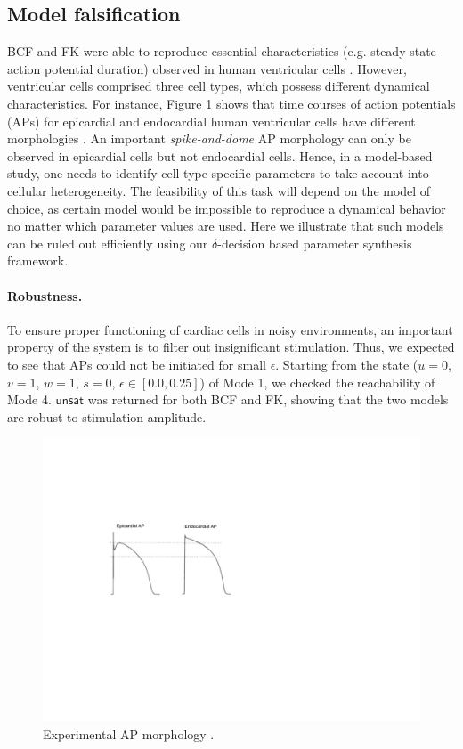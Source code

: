 \subsection{Model falsification}
BCF and FK were able to reproduce essential characteristics (e.g. steady-state action potential duration) observed in human ventricular cells \cite{fenton98,orovio08}. However, ventricular cells comprised three cell types, which possess different dynamical characteristics. For instance, Figure \ref{ap} shows that time courses of action potentials (APs) for epicardial and endocardial human ventricular cells have different morphologies \cite{nabauer96}. An important \textit{spike-and-dome} AP morphology can only be observed in epicardial cells but not endocardial cells. Hence, in a model-based study, one needs to identify cell-type-specific parameters to take account into cellular heterogeneity. The feasibility of this task will depend on the model of choice, as certain model would be impossible to reproduce a dynamical behavior no matter which parameter values are used. Here we illustrate that such models can be ruled out efficiently using our $\delta$-decision based parameter synthesis framework.

\paragraph{Robustness.} 
To ensure proper functioning of cardiac cells in noisy environments, an important property of the system is to filter out insignificant stimulation. Thus, we expected to see that APs could not be initiated for small $\epsilon$. Starting from the state ($u = 0$, $v = 1$, $w = 1$, $s = 0$, $\epsilon \in [0.0,0.25]$) of Mode 1, we checked the reachability of Mode 4. $\mathsf{unsat}$ was returned for both BCF and FK, showing that the two models are robust to stimulation amplitude.

\begin{figure}[th]
\centering
\includegraphics[scale=0.8]{fig-ap}
\caption{Experimental AP morphology \cite{nabauer96}.}
\label{ap}
\end{figure}

